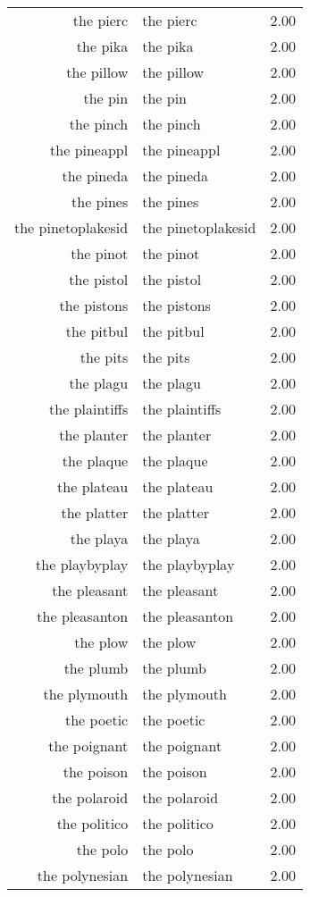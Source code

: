 \begin{table}[ht]
\begin{tabular}{rlr}
  the pierc & the pierc & 2.00 \\ 
  the pika & the pika & 2.00 \\ 
  the pillow & the pillow & 2.00 \\ 
  the pin & the pin & 2.00 \\ 
  the pinch & the pinch & 2.00 \\ 
  the pineappl & the pineappl & 2.00 \\ 
  the pineda & the pineda & 2.00 \\ 
  the pines & the pines & 2.00 \\ 
  the pinetoplakesid & the pinetoplakesid & 2.00 \\ 
  the pinot & the pinot & 2.00 \\ 
  the pistol & the pistol & 2.00 \\ 
  the pistons & the pistons & 2.00 \\ 
  the pitbul & the pitbul & 2.00 \\ 
  the pits & the pits & 2.00 \\ 
  the plagu & the plagu & 2.00 \\ 
  the plaintiffs & the plaintiffs & 2.00 \\ 
  the planter & the planter & 2.00 \\ 
  the plaque & the plaque & 2.00 \\ 
  the plateau & the plateau & 2.00 \\ 
  the platter & the platter & 2.00 \\ 
  the playa & the playa & 2.00 \\ 
  the playbyplay & the playbyplay & 2.00 \\ 
  the pleasant & the pleasant & 2.00 \\ 
  the pleasanton & the pleasanton & 2.00 \\ 
  the plow & the plow & 2.00 \\ 
  the plumb & the plumb & 2.00 \\ 
  the plymouth & the plymouth & 2.00 \\ 
  the poetic & the poetic & 2.00 \\ 
  the poignant & the poignant & 2.00 \\ 
  the poison & the poison & 2.00 \\ 
  the polaroid & the polaroid & 2.00 \\ 
  the politico & the politico & 2.00 \\ 
  the polo & the polo & 2.00 \\ 
  the polynesian & the polynesian & 2.00 \\ 

\end{tabular}
\end{table}
